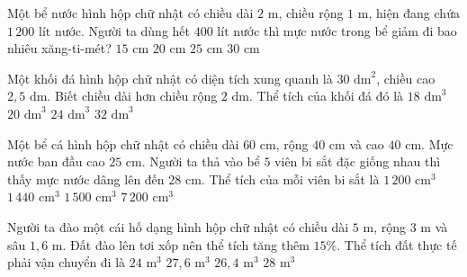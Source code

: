\begin{ex} %
Một bể nước hình hộp chữ nhật có chiều dài $2\text{ m}$, chiều rộng $1\text{ m}$, hiện đang chứa $1\,200\text{ lít}$ nước. Người ta dùng hết $400\text{ lít}$ nước thì mực nước trong bể giảm đi bao nhiêu xăng-ti-mét?
\choice
{$15\text{ cm}$}
{\True $20\text{ cm}$}
{$25\text{ cm}$}
{$30\text{ cm}$}
\end{ex}

\begin{ex} %
Một khối đá hình hộp chữ nhật có diện tích xung quanh là $30\text{ dm}^2$, chiều cao $2{,}5\text{ dm}$. Biết chiều dài hơn chiều rộng $2\text{ dm}$. Thể tích của khối đá đó là
\choice
{$18\text{ dm}^3$}
{\True $20\text{ dm}^3$}
{$24\text{ dm}^3$}
{$32\text{ dm}^3$}
\end{ex}

\begin{ex} %
Một bể cá hình hộp chữ nhật có chiều dài $60\text{ cm}$, rộng $40\text{ cm}$ và cao $40\text{ cm}$. Mực nước ban đầu cao $25\text{ cm}$. Người ta thả vào bể $5$ viên bi sắt đặc giống nhau thì thấy mực nước dâng lên đến $28\text{ cm}$. Thể tích của mỗi viên bi sắt là
\choice
{$1\,200\text{ cm}^3$}
{\True $1\,440\text{ cm}^3$}
{$1\,500\text{ cm}^3$}
{$7\,200\text{ cm}^3$}
\end{ex}

\begin{ex} %
Người ta đào một cái hố dạng hình hộp chữ nhật có chiều dài $5\text{ m}$, rộng $3\text{ m}$ và sâu $1{,}6\text{ m}$. Đất đào lên tơi xốp nên thể tích tăng thêm $15\%$. Thể tích đất thực tế phải vận chuyển đi là
\choice
{$24\text{ m}^3$}
{\True $27{,}6\text{ m}^3$}
{$26{,}4\text{ m}^3$}
{$28\text{ m}^3$}
\end{ex}

